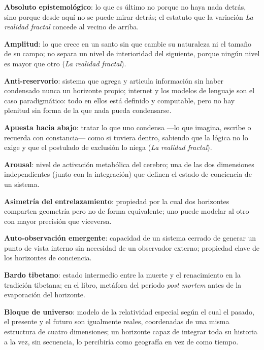 \noindent {}

\glos \textbf{Absoluto epistemológico}: lo que es último no porque no haya nada detrás, sino porque desde aquí no se puede mirar detrás; el estatuto que la variación \emph{La realidad fractal} concede al vecino de arriba.

\glos \textbf{Amplitud}: lo que crece en un santo sin que cambie su naturaleza ni el tamaño de su campo; no separa un nivel de interioridad del siguiente, porque ningún nivel es mayor que otro (\emph{La realidad fractal}).

\glos \textbf{Anti-reservorio}: sistema que agrega y articula información sin haber condensado nunca un horizonte propio; internet y los modelos de lenguaje son el caso paradigmático: todo en ellos está definido y computable, pero no hay plenitud sin forma de la que nada pueda condensarse.

\glos \textbf{Apuesta hacia abajo}: tratar lo que uno condensa —lo que imagina, escribe o recuerda con constancia— como si tuviera dentro, sabiendo que la lógica no lo exige y que el postulado de exclusión lo niega (\emph{La realidad fractal}).

\glos \textbf{Arousal}: nivel de activación metabólica del cerebro; una de las dos dimensiones independientes (junto con la integración) que definen el estado de conciencia de un sistema.

\glos \textbf{Asimetría del entrelazamiento}: propiedad por la cual dos horizontes comparten geometría pero no de forma equivalente; uno puede modelar al otro con mayor precisión que viceversa.

\glos \textbf{Auto-observación emergente}: capacidad de un sistema cerrado de generar un punto de vista interno sin necesidad de un observador externo; propiedad clave de los horizontes de conciencia.

\glos \textbf{Bardo tibetano}: estado intermedio entre la muerte y el renacimiento en la tradición tibetana; en el libro, metáfora del periodo \emph{post mortem} antes de la evaporación del horizonte.

\glos \textbf{Bloque de universo}: modelo de la relatividad especial según el cual el pasado, el presente y el futuro son igualmente reales, coordenadas de una misma estructura de cuatro dimensiones; un horizonte capaz de integrar toda su historia a la vez, sin secuencia, lo percibiría como geografía en vez de como tiempo.

